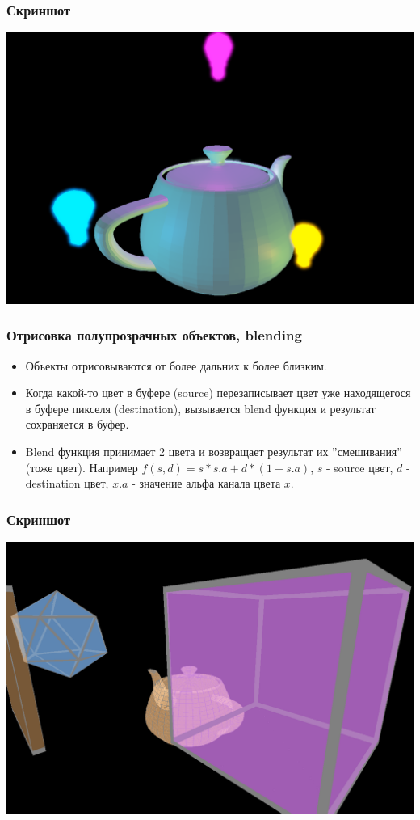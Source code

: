 \documentclass{beamer}
\begin{document}
\begin{frame}
	\frametitle{Скриншот}
	\begin{center}
		\includegraphics[scale=0.28]{scene3.png} 
	\end{center}
\end{frame}

\begin{frame}
	\frametitle{Отрисовка полупрозрачных объектов, blending}
	
	\begin{itemize}
		\item<1-> Объекты отрисовываются от более дальних к более близким.
		\item<1-> Когда какой-то цвет в буфере (source) перезаписывает цвет уже находящегося в буфере пикселя (destination), вызывается blend функция и результат сохраняется в буфер.
		\item<1-> Blend функция принимает 2 цвета и возвращает результат их ''смешивания'' (тоже цвет). Например $f(s, d) = s * s.a + d * (1 - s.a)$, $s$ - source цвет, $d$ - destination цвет, $x.a$ - значение альфа канала цвета $x$.  
	\end{itemize}
\end{frame}

{
\begin{frame}
	\frametitle{Скриншот}
	\begin{center}
		\includegraphics[scale=0.28]{scene4.png} 
	\end{center}
\end{frame}
}
\end{document}

